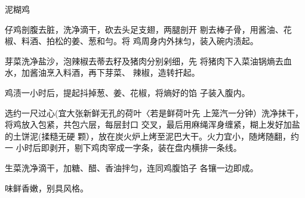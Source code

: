 \begin{recipe}[叫化鸡]{泥糊鸡}

\ingredients




\cooking

\step 仔鸡剖腹去脏，洗净滴干，砍去头足支翅，两腿剖开 剔去棒子骨，用酱油、花椒、料酒、拍松的姜、葱和勻。将 鸡周身内外抹匀，装入碗内渍起。

\step 芽菜洗净盐沙，泡辣椒去蒂去籽及猪肉分别剁细，先 将猪肉下入菜油锅熵去血水，加酱油烹入料酒，再下芽菜、 辣椒，造转扞起。

\step 鸡渍一小时后，提起抖掉葱、姜、花椒，将熵好的馅 子装入腹内。

\step 选约一尺过心(宜大张新鲜无孔的荷叶〈若是鲜荷叶先 上笼汽一分钟）洗净抹干，将鸡放入包紧，共包六层，每层封口 交叉，最后用麻绳浑身缠紧，糊上发好加盐的土饼泥(揉糙无硬 颗），放在炭火炉上烤至泥巴大干。火力宜小，随烤随翻，约一 小时后即剥开，剔下鸡肉宰成一字条，装在盘内横排一条线。

\step 生菜洗净滴干，加糖、醋、香油拌匀，连同鸡腹馅子 各镶一边即成。

\notes

味鲜香嫩，别具风格。

\end{recipe}

